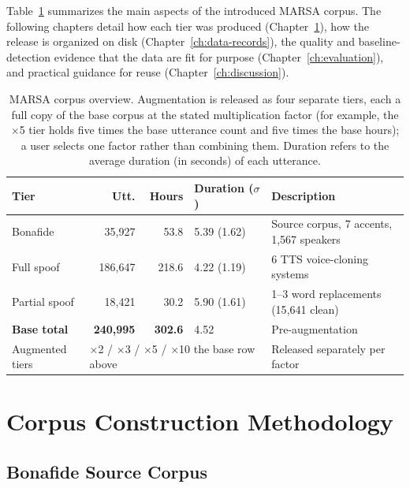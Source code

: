 \documentclass[11pt]{report}
\begin{document}
Table~\ref{tab:overview} summarizes the main aspects of the introduced
MARSA corpus. The following chapters detail how each tier was produced
(Chapter~\ref{ch:methods}), how the release is organized on disk
(Chapter~\ref{ch:data-records}), the quality and baseline-detection
evidence that the data are fit for purpose
(Chapter~\ref{ch:evaluation}), and practical guidance for reuse
(Chapter~\ref{ch:discussion}).

\begin{table}[H]
\centering
\caption{MARSA corpus overview. Augmentation is released as four
separate tiers, each a full copy of the base corpus at the stated
multiplication factor (for example, the $\times$5 tier holds five times
the base utterance count and five times the base hours); a user selects
one factor rather than combining them. Duration refers to the average duration (in seconds) of each utterance.}
\label{tab:overview}
\small
\begin{tabular}{lrrlp{5.5cm}}
\toprule
\textbf{Tier} & \textbf{Utt.} & \textbf{Hours} & \textbf{Duration ($\sigma$)}  & \textbf{Description} \\
\midrule
Bonafide            & 35{,}927  & 53.8  & 5.39 (1.62)  & Source corpus, 7 accents, 1{,}567 speakers \\
Full spoof          & 186{,}647 & 218.6 & 4.22 (1.19)  & 6 TTS voice-cloning systems \\
Partial spoof       & 18{,}421  & 30.2  & 5.90 (1.61)  & 1--3 word replacements (15{,}641 clean) \\
\midrule
\textbf{Base total} & \textbf{240{,}995} & \textbf{302.6} & 4.52 &  Pre-augmentation \\
\midrule
Augmented tiers & \multicolumn{3}{l}{$\times$2 / $\times$3 / $\times$5 / $\times$10 the base row above} & Released separately per factor \\
\bottomrule
\end{tabular}
\end{table}

\chapter{Corpus Construction Methodology}
\label{ch:methods}

\section{Bonafide Source Corpus}
\label{sec:bonafide}
\end{document}
